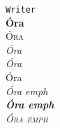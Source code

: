 \documentclass{article}
\begin{document}
\texttt{Writer}\\
\textbf{Óra}\\
\textsc{Óra}\\
\textit{Óra}\\
\textsl{Óra}\\
\textsf{Óra}\\
\emph{\textit{Óra emph}}\\
\emph{\textbf{Óra emph}}\\
\emph{\textsc{Óra emph}}\\
\end{document}
